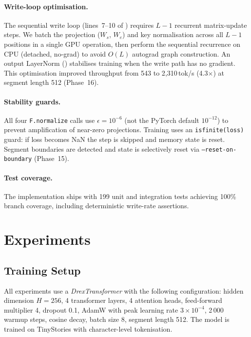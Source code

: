 \documentclass{article}
\begin{document}
\paragraph{Write-loop optimisation.}
The sequential write loop
(lines~7--10 of ) requires $L-1$ recurrent matrix-update steps.  We
batch the projection ($W_s$, $W_e$) and key normalisation across all $L-1$ positions
in a single GPU operation, then perform the sequential recurrence on CPU (detached,
no-grad) to avoid $O(L)$ autograd graph construction.  An output LayerNorm
() stabilises training when the write path has no gradient.
This optimisation improved throughput from 543 to 2{,}310\,tok/s (4.3$\times$) at
segment length 512 (Phase~16).

\paragraph{Stability guards.}
All four \texttt{F.normalize} calls use $\epsilon = 10^{-6}$ (not the PyTorch default
$10^{-12}$) to prevent amplification of near-zero projections.  Training uses an
\texttt{isfinite(loss)} guard: if loss becomes NaN the step is skipped and memory state
is reset.  Segment boundaries are detected and state is selectively reset via
\texttt{--reset-on-boundary} (Phase~15).

\paragraph{Test coverage.}
The implementation ships with 199 unit and integration tests achieving 100\% branch
coverage, including deterministic write-rate assertions.

\section{Experiments}
\label{sec:experiments}

\subsection{Training Setup}

All experiments use a \emph{DrexTransformer} with the following configuration:
hidden dimension $H=256$, 4 transformer layers, 4 attention heads, feed-forward
multiplier 4, dropout 0.1, AdamW \citep{loshchilov2019decoupled} with peak learning
rate $3 \times 10^{-4}$, 2\,000 warmup steps, cosine decay, batch size 8, segment
length 512.  The model is trained on TinyStories \citep{eldan2023tinystories} with
character-level tokenisation.
\end{document}
